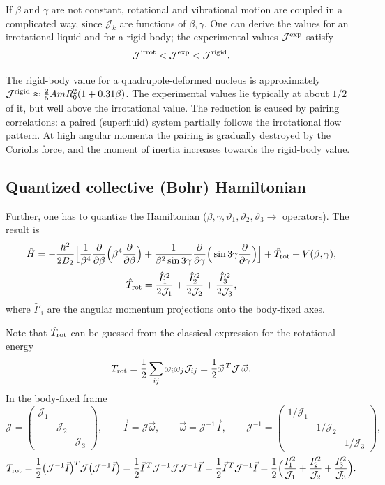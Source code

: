 \documentclass[11pt,a4paper]{article}
\newcommand{\op}[1]{\hat{#1}}
\begin{document}
If $\beta$ and $\gamma$ are not constant, rotational and vibrational motion are coupled in a complicated way, since $\mathcal J_k$ are functions of $\beta,\gamma$. One can derive the values for an irrotational liquid and for a rigid body; the experimental values $\mathcal J^{\rm exp}$ satisfy
\[
\mathcal J^{\rm irrot}<\mathcal J^{\rm exp}<\mathcal J^{\rm rigid}.
\]

The rigid-body value for a quadrupole-deformed nucleus is approximately $\mathcal J^{\rm rigid}\approx\frac25AmR_0^2(1+0.31\beta)$. The experimental values lie typically at about $1/2$ of it, but well above the irrotational value. The reduction is caused by pairing correlations: a paired (superfluid) system partially follows the irrotational flow pattern. At high angular momenta the pairing is gradually destroyed by the Coriolis force, and the moment of inertia increases towards the rigid-body value.


\subsection{Quantized collective (Bohr) Hamiltonian}
Further, one has to quantize the Hamiltonian ($\beta,\gamma,\vartheta_1,\vartheta_2,\vartheta_3\to$ operators). The result is
\[
\op H=-\frac{\hbar^2}{2B_2}\Big[\frac{1}{\beta^4}\frac{\partial}{\partial\beta}\Big(\beta^4\frac{\partial}{\partial\beta}\Big)
+\frac{1}{\beta^2\sin3\gamma}\frac{\partial}{\partial\gamma}\Big(\sin3\gamma\frac{\partial}{\partial\gamma}\Big)\Big]
+\op T_{\rm rot}+V(\beta,\gamma),
\]
\[
\op T_{\rm rot}=\frac{\op I'^2_1}{2\mathcal J_1}+\frac{\op I'^2_2}{2\mathcal J_2}+\frac{\op I'^2_3}{2\mathcal J_3},
\]
where $\op I'_i$ are the angular momentum projections onto the body-fixed axes.

Note that $\op T_{\rm rot}$ can be guessed from the classical expression for the rotational energy
\[
T_{\rm rot}=\frac12\sum_{ij}\omega_i\omega_j\mathcal J_{ij}=\frac12\vec\omega^{\,T}\mathcal J\,\vec\omega .
\]
In the body-fixed frame
\[
\mathcal J=\begin{pmatrix}\mathcal J_1&&\\&\mathcal J_2&\\&&\mathcal J_3\end{pmatrix},\qquad
\vec I=\mathcal J\vec\omega,\qquad \vec\omega=\mathcal J^{-1}\vec I,\qquad
\mathcal J^{-1}=\begin{pmatrix}1/\mathcal J_1&&\\&1/\mathcal J_2&\\&&1/\mathcal J_3\end{pmatrix},
\]
\[
T_{\rm rot}=\frac12\big(\mathcal J^{-1}\vec I\big)^T\mathcal J\big(\mathcal J^{-1}\vec I\big)
=\frac12\vec I^{\,T}\mathcal J^{-1}\mathcal J\mathcal J^{-1}\vec I
=\frac12\vec I^{\,T}\mathcal J^{-1}\vec I
=\frac12\Big(\frac{I'^2_1}{\mathcal J_1}+\frac{I'^2_2}{\mathcal J_2}+\frac{I'^2_3}{\mathcal J_3}\Big).
\]
\end{document}
